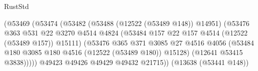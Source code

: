 \begin{lexlean}{RustStd}
\begin{coremodule}
                                                  (@53469
                                                    (@53474
                                                      (@53482
                                                        (@53488 (@12522 (@53489 @148)) @14951)
                                                        (@53476
                                                          @363
                                                          @531
                                                          @22
                                                          @3270
                                                          @4514
                                                          @4824
                                                          (@53484
                                                            @157
                                                            @22
                                                            @157
                                                            @4514
                                                            (@12522 (@53489 @157))
                                                            @15111)
                                                          (@53476
                                                            @365
                                                            @371
                                                            @3085
                                                            @27
                                                            @4516
                                                            @4056
                                                            (@53484
                                                              @180
                                                              @3085
                                                              @180
                                                              @4516
                                                              (@12522 (@53489 @180))
                                                              @15128)
                                                            (@12641 @53415 @3838)))))
                                                    @49423
                                                    @49426
                                                    @49429
                                                    @49432
                                                    @21715))
                                                (@13638 (@53441 @148))

\end{coremodule}
\end{lexlean}
